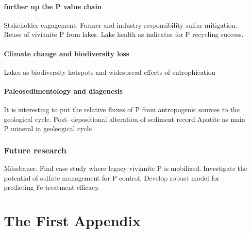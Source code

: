 \documentclass[12pt,twoside]{book}
\begin{document}
\subsubsection{further up the P value chain}\label{further-up-the-p-value-chain}

Stakeholder engagement. Farmer and industry responsibility sulfur mitigation. Reuse of vivianite P from lakes. Lake health as indicator for P recycling success.

\subsubsection{Climate change and biodiversity loss}\label{climate-change-and-biodiversity-loss}

Lakes as biodiversity hotspots and widespread effects of eutrophication

\subsubsection{Paleosedimentology and diagenesis}\label{paleosedimentology-and-diagenesis}

It is interesting to put the relative fluxes of P from antropogenic sources to the geological cycle.
Post- depositional alteration of sediment record \citep{Dijkstra2018} Apatite as main P mineral in geoleogical cycle\citep{Zhao2024}

\subsection{Future research}\label{future-research}

Mössbauer.
Find case study where legacy vivianite P is mobilized.
Investigate the potential of sulfate management for P control.
Develop robust model for predicting Fe treatment efficacy.

\appendix

\chapter{The First Appendix}\label{the-first-appendix}
\renewcommand\bibname{References}


  \listoffigures
  \clearpage

  \listoftables
  \clearpage
\end{document}
